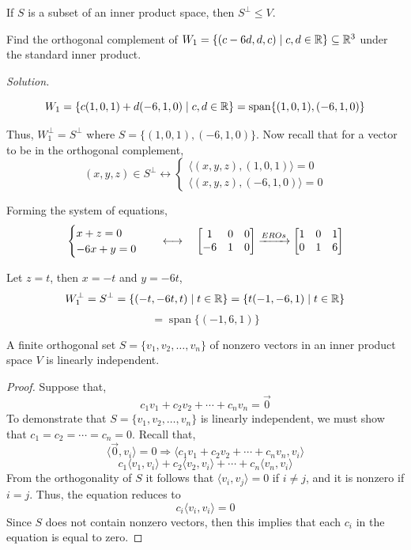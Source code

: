 \begin{theorem}
If $S$ is a subset of an inner product space, then $S^\perp \leq V$.
\end{theorem}

\begin{example}
Find the orthogonal complement of $W_1 = \{(c - 6d, d, c) \mid c, d \in \mathbb{R}\} \subseteq \mathbb{R}^3$ under the standard inner product.
\end{example}

\textit{Solution.} 

$$W_1 = \{c(1, 0, 1) + d(-6, 1, 0) \mid c, d \in \mathbb{R}\} = \operatorname{span}\{(1, 0, 1), (-6, 1, 0)\}$$

Thus, $W_1^\perp = S^\perp$ where $S = \{(1, 0, 1), (-6, 1, 0)\}$. Now recall that for a vector to be in the orthogonal complement,
$$(x, y, z) \in S^\perp \longleftrightarrow \begin{cases}
    \langle (x, y, z), (1, 0, 1)\rangle = 0 \\
    \langle (x, y, z), (-6, 1, 0)\rangle = 0
\end{cases}$$

Forming the system of equations,
$$\begin{cases}
    x + z = 0 \\
    -6x + y = 0
\end{cases} \quad \longleftrightarrow \quad \begin{bmatrix} 1 & 0 & 0 \\ -6 & 1 & 0 \end{bmatrix} \xrightarrow{EROs} \begin{bmatrix} 1 & 0 & 1 \\ 0 & 1 & 6 \end{bmatrix}$$

Let $z = t$, then $x = -t$ and $y = -6t$,
$$W_1^\perp = S^\perp = \{(-t, -6t, t) \mid t \in \mathbb{R}\} = \{t(-1, -6, 1) \mid t \in \mathbb{R}\}$$
$$=\boxed{\operatorname{span}\{(-1, 6, 1)\}}$$

\begin{theorem}
A finite orthogonal set $S = \{v_1, v_2, \dots, v_n\}$ of nonzero vectors in an inner product space $V$ is linearly independent.
\end{theorem}

\begin{proof}
Suppose that,
$$c_1v_1 + c_2v_2 + \cdots + c_nv_n = \vec{0}$$
To demonstrate that $S = \{v_1, v_2, \dots, v_n\}$ is linearly independent, we must show that $c_1 = c_2 = \cdots = c_n = 0$. Recall that,
$$\langle\vec0, v_i\rangle = 0 \Longrightarrow \langle c_1v_1 + c_2v_2 + \cdots + c_nv_n, v_i \rangle$$
$$c_1\langle v_1, v_i \rangle +c_2\langle v_2, v_i \rangle + \cdots + c_n\langle v_n, v_i\rangle$$
From the orthogonality of $S$ it follows that $\langle v_i, v_j \rangle = 0$ if $i \neq j$, and it is nonzero if $i = j$. Thus, the equation reduces to
$$c_i\langle v_i, v_i\rangle = 0$$
Since $S$ does not contain nonzero vectors, then this implies that each $c_i$ in the equation is equal to zero.
\end{proof}


